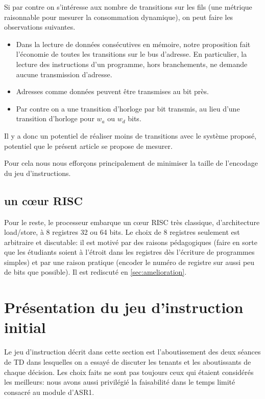 \documentclass[architecture]{compas2018}
\begin{document}
Si par contre on s'intéresse aux nombre de transitions sur les fils (une métrique raisonnable pour mesurer la consommation dynamique), on peut faire les observations suivantes.

\begin{itemize}
\item Dans la lecture de données consécutives en mémoire, notre proposition fait l'économie de toutes les transitions sur le bus d'adresse.
  En particulier, la lecture des instructions d'un programme, hors branchements,  ne demande aucune transmission d'adresse.
\item Adresses comme données peuvent être transmises au bit près.
\item Par contre on a une transition d'horloge par bit transmis, au lieu d'une transition d'horloge pour $w_a$ ou $w_d$ bits.
\end{itemize}
Il y a donc un potentiel de réaliser moins de transitions avec le système proposé, potentiel que le présent article se propose de mesurer.

Pour cela nous nous efforçons principalement de minimiser la taille de l'encodage du jeu d'instructions.

\subsection{un c\oe ur  RISC}
Pour le reste, le processeur embarque un c\oe ur RISC très classique, d'architecture load/store, à 8 registres 32 ou 64 bits.  
Le choix de 8 registres seulement est arbitraire et discutable: il est motivé par des raisons pédagogiques (faire en sorte que les étudiants soient à l'étroit dans les registres  dès l'écriture de programmes simples) et par une raison pratique (encoder le numéro de registre sur aussi peu de bits que possible).
Il est rediscuté en \ref{sec:amelioration}. 









\section{Présentation du jeu d'instruction initial}
Le jeu d'instruction décrit dans cette section est l'aboutissement des deux séances de TD dans lesquelles on a essayé de discuter les tenants et les aboutissants de chaque décision.
Les choix faits ne sont pas toujours ceux qui étaient considérés les meilleurs: nous avons aussi privilégié la faisabilité dans le temps limité consacré au module d'ASR1.
\end{document}
